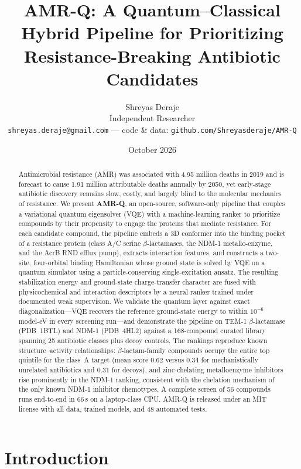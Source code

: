 \documentclass[10pt,twocolumn]{article}
\title{\bfseries AMR-Q: A Quantum--Classical Hybrid Pipeline for Prioritizing
Resistance-Breaking Antibiotic Candidates}
\author{Shreyas Deraje\\
\small Independent Researcher\\
\small \texttt{shreyas.deraje@gmail.com} --- code \& data: \texttt{github.com/Shreyasderaje/AMR-Q}
}
\date{October 2026}
\begin{document}
\maketitle

\begin{abstract}
Antimicrobial resistance (AMR) was associated with 4.95 million deaths in 2019 and is
forecast to cause 1.91 million attributable deaths annually by 2050, yet early-stage
antibiotic discovery remains slow, costly, and largely blind to the molecular mechanics
of resistance. We present \textbf{AMR-Q}, an open-source, software-only pipeline that
couples a variational quantum eigensolver (VQE) with a machine-learning ranker to
prioritize compounds by their propensity to engage the proteins that mediate resistance.
For each candidate compound, the pipeline embeds a 3D conformer into the binding pocket
of a resistance protein (class A/C serine $\beta$-lactamases, the NDM-1 metallo-enzyme,
and the AcrB RND efflux pump), extracts interaction features, and constructs a two-site,
four-orbital binding Hamiltonian whose ground state is solved by VQE on a quantum
simulator using a particle-conserving single-excitation ansatz. The resulting
stabilization energy and ground-state charge-transfer character are fused with
physicochemical and interaction descriptors by a neural ranker trained under documented
weak supervision. We validate the quantum layer against exact diagonalization---VQE
recovers the reference ground-state energy to within $10^{-6}$ model-eV in every
screening run---and demonstrate the pipeline on TEM-1 $\beta$-lactamase (PDB~1BTL) and
NDM-1 (PDB~4HL2) against a 168-compound curated library spanning 25 antibiotic classes
plus decoy controls. The rankings reproduce known structure--activity relationships:
$\beta$-lactam-family compounds occupy the entire top quintile for the class~A target
(mean score $0.62$ versus $0.34$ for mechanistically unrelated antibiotics and $0.31$
for decoys), and zinc-chelating metalloenzyme inhibitors rise prominently in the NDM-1
ranking, consistent with the chelation mechanism of the only known NDM-1 inhibitor
chemotypes. A complete screen of 56 compounds runs end-to-end in 66\,s on a laptop-class
CPU. AMR-Q is released under an MIT license with all data, trained models, and 48
automated tests.
\end{abstract}

\section{Introduction}
\label{sec:intro}
\end{document}

